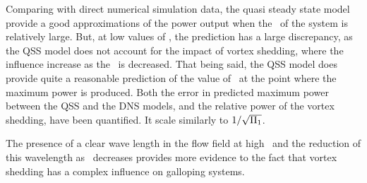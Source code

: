 Comparing with direct numerical simulation data, the quasi steady state model provide a good approximations of the power output when the \massstiff\ of the system is relatively large. But, at low values of \massstiff, the prediction has a large discrepancy, as the QSS model does not account for the impact of vortex shedding, where the influence increase as the \massstiff\ is decreased. That being said, the QSS model does provide quite a reasonable prediction of the value of \massstiff\ at the point where the maximum power is produced. Both the error in predicted maximum power between the QSS and the DNS models, and the relative power of the vortex shedding, have been quantified. It scale similarly to $1/\sqrt{\Pi_1}$.

The presence of a clear wave length in the flow field at high \massstiff\ and the reduction of this wavelength as \massstiff\ decreases provides more evidence to the fact that vortex shedding has a complex influence on galloping systems.  





    


